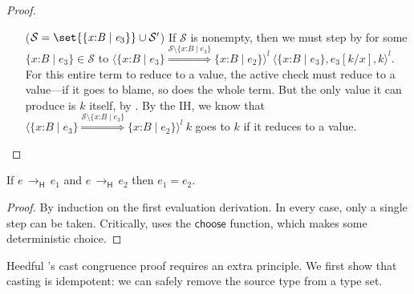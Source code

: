\documentclass[9pt]{extarticle}
\newcommand{\ottnt}[1]{\mathit{#1}}
\newcommand{\ottsym}[1]{#1}
\begin{document}
{\begin{lemma}
\begin{proof}
{\begin{itemize}
      \item[($\mathcal{S}  \ottsym{=}    \set{   \{ \mathit{x} \mathord{:} \ottnt{B} \mathrel{\mid} \ottnt{e_{{\mathrm{3}}}} \}   }   \cup  \mathcal{S}' $)] If $\mathcal{S}$ is nonempty,
        then we must step by  for some $  \{ \mathit{x} \mathord{:} \ottnt{B} \mathrel{\mid} \ottnt{e_{{\mathrm{3}}}} \}   \in  \mathcal{S} $
        to $ \langle   \{ \mathit{x} \mathord{:} \ottnt{B} \mathrel{\mid} \ottnt{e_{{\mathrm{3}}}} \}   \mathord{ \overset{  \mathcal{S}  \setminus   \{ \mathit{x} \mathord{:} \ottnt{B} \mathrel{\mid} \ottnt{e_{{\mathrm{3}}}} \}   }{\Rightarrow} }   \{ \mathit{x} \mathord{:} \ottnt{B} \mathrel{\mid} \ottnt{e_{{\mathrm{2}}}} \}   \rangle^{ \ottnt{l} } ~   \langle   \{ \mathit{x} \mathord{:} \ottnt{B} \mathrel{\mid} \ottnt{e_{{\mathrm{3}}}} \}  ,   \ottnt{e_{{\mathrm{3}}}}  [  \ottnt{k} / \mathit{x}  ]  ,  \ottnt{k}  \rangle^{ \ottnt{l} }  $.
For this entire term to reduce to a value, the active check
        must reduce to a value---if it goes to blame, so does the
        whole term. But the only value it can produce is $\ottnt{k}$
        itself, by .
By the IH, we know that $ \langle   \{ \mathit{x} \mathord{:} \ottnt{B} \mathrel{\mid} \ottnt{e_{{\mathrm{3}}}} \}   \mathord{ \overset{  \mathcal{S}  \setminus   \{ \mathit{x} \mathord{:} \ottnt{B} \mathrel{\mid} \ottnt{e_{{\mathrm{3}}}} \}   }{\Rightarrow} }   \{ \mathit{x} \mathord{:} \ottnt{B} \mathrel{\mid} \ottnt{e_{{\mathrm{2}}}} \}   \rangle^{ \ottnt{l} } ~  \ottnt{k} $ goes to $\ottnt{k}$ if it reduces to a value.
      \end{itemize}
    \fi}
  \end{proof}
\end{lemma}

\begin{lemma}
  \label{lem:heedfuldeterminism}
  If $\ottnt{e} \,  \longrightarrow _{  \mathsf{H}  }  \, \ottnt{e_{{\mathrm{1}}}}$ and $\ottnt{e} \,  \longrightarrow _{  \mathsf{H}  }  \, \ottnt{e_{{\mathrm{2}}}}$ then $\ottnt{e_{{\mathrm{1}}}}  \ottsym{=}  \ottnt{e_{{\mathrm{2}}}}$.
\begin{proof}
    By induction on the first evaluation derivation. In every case,
    only a single step can be taken. Critically,  uses the
    $ \mathsf{choose} $ function, which makes some deterministic choice.
  \end{proof}
\end{lemma}

Heedful \lambdah's cast congruence proof requires an extra
principle. We first show that casting is idempotent: we can safely
remove the source type from a type set.

}
\end{document}
